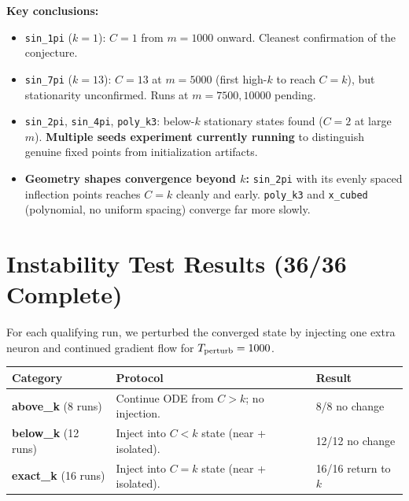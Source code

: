 \documentclass[11pt, letterpaper]{article}
\begin{document}
\vspace{4pt}
\textbf{Key conclusions:}
\begin{itemize}[leftmargin=1.4em, itemsep=0pt]
  \item \texttt{sin\_1pi} ($k=1$): $C=1$ from $m=1000$ onward. Cleanest confirmation of the conjecture.
  \item \texttt{sin\_7pi} ($k=13$): $C=13$ at $m=5000$ (first high-$k$ to reach $C=k$), but stationarity unconfirmed. Runs at $m=7500, 10000$ pending.
  \item \texttt{sin\_2pi}, \texttt{sin\_4pi}, \texttt{poly\_k3}: below-$k$ stationary states found ($C=2$ at large $m$). \textbf{Multiple seeds experiment currently running} to distinguish genuine fixed points from initialization artifacts.
  \item \textbf{Geometry shapes convergence beyond $k$:} \texttt{sin\_2pi} with its evenly spaced inflection points reaches $C=k$ cleanly and early. \texttt{poly\_k3} and \texttt{x\_cubed} (polynomial, no uniform spacing) converge far more slowly.
\end{itemize}

\section*{Instability Test Results (36/36 Complete)}

For each qualifying run, we perturbed the converged state by injecting one extra neuron
and continued gradient flow for $T_{\rm perturb}=1000$.

\begin{center}
\begin{tabular}{lp{8cm}l}
\toprule
Category & Protocol & Result \\
\midrule
\textbf{above\_k} (8 runs) & Continue ODE from $C > k$; no injection. & 8/8 no change \\
\textbf{below\_k} (12 runs) & Inject into $C < k$ state (near + isolated). & 12/12 no change \\
\textbf{exact\_k} (16 runs) & Inject into $C = k$ state (near + isolated). & 16/16 return to $k$ \\
\bottomrule
\end{tabular}
\end{center}
\end{document}

